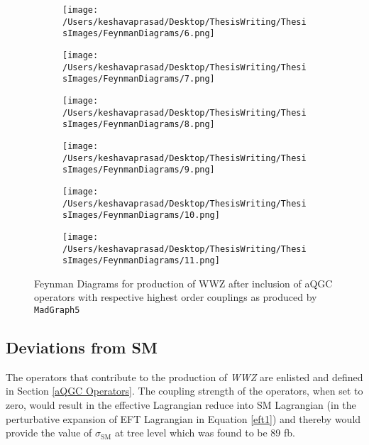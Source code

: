 \begin{figure}
\begin{subfigure}[b]{0.3\textwidth}
	\centering
	\texttt{[image: /Users/keshavaprasad/Desktop/ThesisWriting/ThesisImages/FeynmanDiagrams/6.png]}
\end{subfigure}
\begin{subfigure}[b]{0.3\textwidth}
	\centering
	\texttt{[image: /Users/keshavaprasad/Desktop/ThesisWriting/ThesisImages/FeynmanDiagrams/7.png]}
\end{subfigure}
\begin{subfigure}[b]{0.3\textwidth}
	\centering
	\texttt{[image: /Users/keshavaprasad/Desktop/ThesisWriting/ThesisImages/FeynmanDiagrams/8.png]}
\end{subfigure}
\begin{subfigure}[b]{0.3\textwidth}
	\centering
	\texttt{[image: /Users/keshavaprasad/Desktop/ThesisWriting/ThesisImages/FeynmanDiagrams/9.png]}
\end{subfigure}
\begin{subfigure}[b]{0.3\textwidth}
	\centering
	\texttt{[image: /Users/keshavaprasad/Desktop/ThesisWriting/ThesisImages/FeynmanDiagrams/10.png]}
\end{subfigure}
\begin{subfigure}[b]{0.3\textwidth}
	\centering
	\texttt{[image: /Users/keshavaprasad/Desktop/ThesisWriting/ThesisImages/FeynmanDiagrams/11.png]}
\end{subfigure}
	\caption{Feynman Diagrams for production of WWZ  after inclusion of aQGC operators with respective highest order couplings as produced by \texttt{MadGraph5}}
	\label{feynmandiagrams}
\end{figure}

\subsection{Deviations from SM}\label{DeviationsTable}
The operators that contribute to the production of \textit{WWZ} are enlisted and defined in Section \ref{aQGC Operators}. 
The coupling strength of the operators, when set to zero, would result in the effective Lagrangian reduce into SM Lagrangian (in the perturbative expansion of EFT Lagrangian in Equation \ref{eft1})  and thereby would provide the value of $\sigma_\text{SM}$ at tree level which was found to be 89 fb. 

